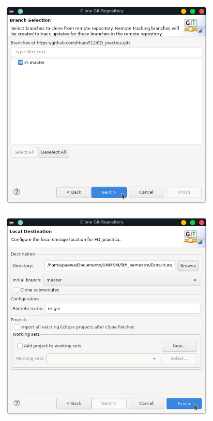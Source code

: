 \documentclass{article}
\begin{document}
\begin{figure}[h!]
  \centering
  \includegraphics[scale=0.75]{./Pictures/015_source_ramas.png}
\end{figure}

\newpage

\begin{figure}[h!]
  \centering
  \includegraphics[scale=0.75]{./Pictures/016_local_destination.png}
\end{figure}
\end{document}
